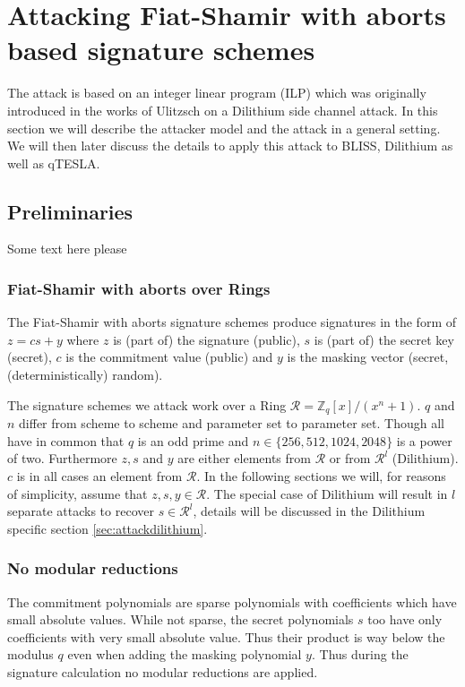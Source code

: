 \documentclass[a4paper,titlepage]{article}
\begin{document}
\section{Attacking Fiat-Shamir with aborts based signature schemes}
The attack is based on an integer linear program (ILP) which was originally introduced in the works of  Ulitzsch \cite{ulitzsch} on a Dilithium side channel attack.
In this section we will describe the attacker model and the attack in a general setting. 
We will then later discuss the details to apply this attack to BLISS, Dilithium as well as qTESLA.

\subsection{Preliminaries}
Some text here please %
\subsubsection{Fiat-Shamir with aborts over Rings}
The Fiat-Shamir with aborts signature schemes produce signatures in the form of $z = cs + y$ where $z$ is (part of) the signature (public), $s$ is (part of) the secret key (secret), $c$ is the commitment value (public) and $y$ is the masking vector (secret, (deterministically) random).

The signature schemes we attack work over a Ring $\mathcal{R} = \mathds{Z}_{q}[x] / (x^{n} + 1)$. $q$ and $n$ differ from scheme to scheme and parameter set to parameter set. Though all have in common that $q$ is an odd prime and $n \in \{256, 512, 1024, 2048\}$ is a power of two. Furthermore $z, s$ and $y$ are either elements from $\mathcal{R}$ or from $\mathcal{R}^{l}$ (Dilithium). $c$ is in all cases an element from $\mathcal{R}$. In the following sections we will, for reasons of simplicity, assume that $z, s, y \in \mathcal{R}$. The special case of Dilithium will result in $l$ separate attacks to recover $s \in \mathcal{R}^{l}$, details will be discussed in the Dilithium specific section \ref{sec:attackdilithium}.


\subsubsection{No modular reductions} \label{sec:nomod}
The commitment polynomials are sparse polynomials with coefficients which have small absolute values. While not sparse, the secret polynomials $s$ too have only coefficients with very small absolute value. Thus their product is way below the modulus $q$ even when adding the masking polynomial $y$.  Thus during the signature calculation no modular reductions are applied.
\end{document}
